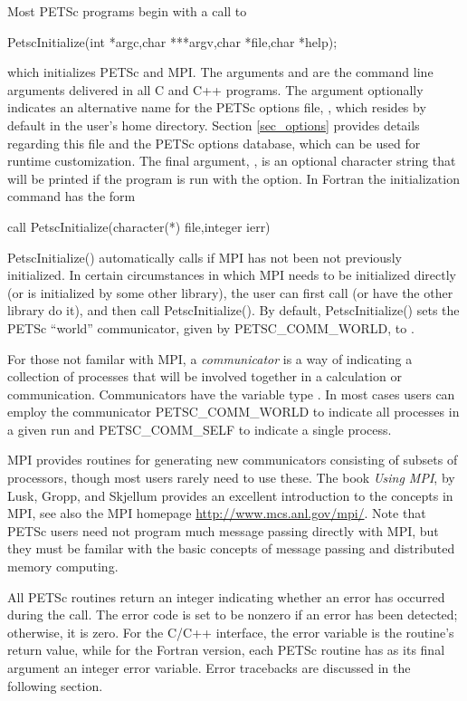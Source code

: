 Most PETSc programs begin with a call to
\begin{tabbing}
  PetscInitialize(int *argc,char ***argv,char *file,char *help);
\end{tabbing}
which initializes PETSc and MPI.  The arguments  and
 are the command line arguments delivered in all C and C++
programs.  The argument 
optionally indicates an alternative name for the PETSc options file,
, which resides by default in the user's home directory.
Section \ref{sec_options} provides details regarding
this file and the PETSc options database, which can be used for runtime
customization. The final argument, , is an optional
character string that will be printed if the program is run with the
 option.  In Fortran the initialization command has the form
\begin{tabbing}
   call PetscInitialize(character(*) file,integer ierr)
\end{tabbing}
PetscInitialize() automatically calls  if MPI
has not been not previously initialized. In certain 
circumstances in which MPI needs to be initialized directly (or is
initialized by some other library), the user can first call
 (or have the other library do it), and then call
PetscInitialize().
By default, PetscInitialize() sets the PETSc ``world''
communicator, given by PETSC\_COMM\_WORLD, to .

For those not familar with MPI, a {\em communicator} is a way of
indicating a collection of processes that will be involved together
in a calculation or communication. Communicators have the variable type
. In most cases users can employ the communicator
PETSC\_COMM\_WORLD to indicate all processes in a given run and
PETSC\_COMM\_SELF to indicate a single process.

MPI provides routines
for generating new communicators consisting of subsets of processors,
though most users rarely need to use these. The book {\em Using MPI},
by Lusk, Gropp, and Skjellum \cite{using-mpi} provides an excellent
introduction to the concepts in MPI, see also the MPI homepage
\href{http://www.mcs.anl.gov/mpi/}{http://www.mcs.anl.gov/mpi/}.
Note that PETSc users need not program much message passing directly
with MPI, but they must be familar with the basic concepts of message
passing and distributed memory computing.

All PETSc routines return an integer indicating whether an error has
occurred during the call.  The error code is set to be nonzero if an
error has been detected; otherwise, it is zero.  For the C/C++
interface, the error variable is the routine's return value, while for
the Fortran version, each PETSc routine has as its final argument an
integer error variable.  Error tracebacks are discussed in the following
section.

